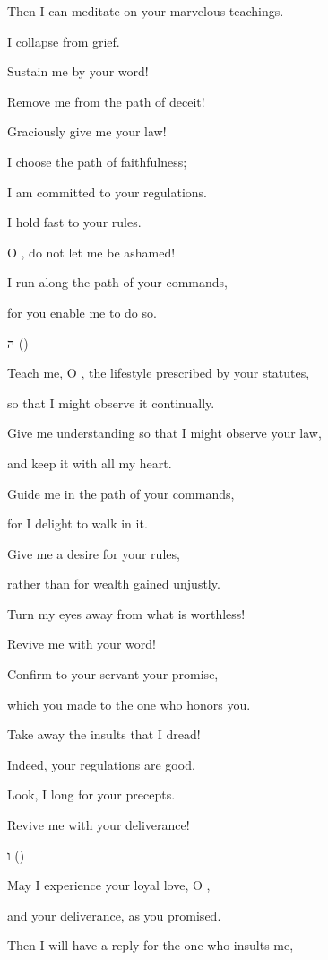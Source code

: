 {\par }{\Q Then I can meditate
on your marvelous
teachings.
\par }{\Q {}I collapse
from grief.
\par }{\Q Sustain
me by your word!
\par }{\Q {}Remove
me from
the path
of deceit!

\par }{\Q Graciously
give me your law!
\par }{\Q {}I choose
the path
of faithfulness;
\par }{\Q I am committed
to your regulations.
\par }{\Q {}I hold fast
to your rules.
\par }{\Q O
{}, do not
let me be ashamed!
\par }{\Q {}I run
along the path
of your commands,
\par }{\Q for
you enable me to do so.
\par }{\SH ה ({})
\par }{\Q {}Teach me, O
{}, the lifestyle prescribed by your statutes,
\par }{\Q so that I might observe it continually.
\par }{\Q {}Give me understanding
so that I might observe
your law,
\par }{\Q and keep
it with all
my heart.
\par }{\Q {}Guide
me in the path
of your commands,
\par }{\Q for
I delight to walk in it.
\par }{\Q {}Give
me
a desire
for your rules,
\par }{\Q rather
than for wealth gained unjustly.
\par }{\Q {}Turn
my eyes
away from what is worthless!

\par }{\Q Revive me with your word!
\par }{\Q {}Confirm
to your servant
your promise,
\par }{\Q which
you made to the one who honors you.
\par }{\Q {}Take away
the insults
that
I dread!

\par }{\Q Indeed,
your regulations
are good.
\par }{\Q {}Look,
I long
for your precepts.
\par }{\Q Revive
me with your deliverance!
\par }{\SH ו ({})
\par }{\Q {}May I experience your loyal love, O
{},
\par }{\Q and your deliverance, as you promised.
\par }{\Q {}Then
I will have a reply
for
the one who insults
me,

}
